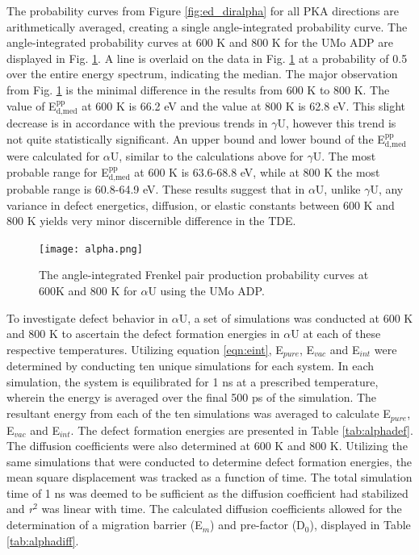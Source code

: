 \documentclass[review]{elsarticle}
\begin{document}
The probability curves from Figure \ref{fig:ed_diralpha} for all PKA directions are arithmetically averaged, creating a single angle-integrated probability curve. The angle-integrated probability curves at 600 K and 800 K for the UMo ADP are displayed in Fig. \ref{fig:alpha}. A line is overlaid on the data in Fig. \ref{fig:alpha} at a probability of 0.5 over the entire energy spectrum, indicating the median. The major observation from Fig. \ref{fig:alpha} is the minimal difference in the results from 600 K to 800 K. The value of E$^{\textrm{pp}}_{\textrm{d,med}}$ at 600 K is 66.2 eV and the value at 800 K is 62.8 eV. This slight decrease is in accordance with the previous trends in $\gamma$U, however this trend is not quite statistically significant. An upper bound and lower bound of the E$^{\textrm{pp}}_{\textrm{d,med}}$ were calculated for $\alpha$U, similar to the calculations above for $\gamma$U. The most probable range for E$^{\textrm{pp}}_{\textrm{d,med}}$ at 600 K is 63.6-68.8 eV, while at 800 K the most probable range is 60.8-64.9 eV. These results suggest that in $\alpha$U, unlike $\gamma$U, any variance in defect energetics, diffusion, or elastic constants between 600 K and 800 K yields very minor discernible difference in the TDE.

\begin{figure}[h]
 \centering
 \texttt{[image: alpha.png]} 	
 \caption{The angle-integrated Frenkel pair production probability curves at 600K and 800 K for $\alpha$U using the UMo ADP.}
 \label{fig:alpha}
\end{figure}

\FloatBarrier

To investigate defect behavior in $\alpha$U, a set of simulations was conducted at 600 K and 800 K to ascertain the defect formation energies in $\alpha$U at each of these respective temperatures. Utilizing equation \ref{eqn:eint}, E$_{pure}$, E$_{vac}$ and E$_{int}$ were determined by conducting ten unique simulations for each system. In each simulation, the system is equilibrated for 1 ns at a prescribed temperature, wherein the energy is averaged over the final 500 ps of the simulation. The resultant energy from each of the ten simulations was averaged to calculate E$_{pure}$, E$_{vac}$ and E$_{int}$. The defect formation energies are presented in Table \ref{tab:alphadef}. The diffusion coefficients were also determined at 600 K and 800 K. Utilizing the same simulations that were conducted to determine defect formation energies, the mean square displacement was tracked as a function of time. The total simulation time of 1 ns was deemed to be sufficient as the diffusion coefficient had stabilized and \textit{r}$^{2}$ was linear with time. The calculated diffusion coefficients allowed for the determination of a migration barrier (E$_{m}$) and pre-factor (D$_{0}$), displayed in Table \ref{tab:alphadiff}.
\end{document}
